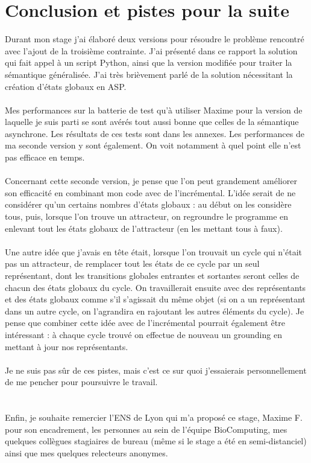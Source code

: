 \documentclass[12pt,a4paper]{article}
\begin{document}
\section{Conclusion et pistes pour la suite}
Durant mon stage j'ai élaboré deux versions pour résoudre le problème rencontré avec l'ajout de la troisième contrainte. J'ai présenté dans ce rapport la solution qui fait appel à un script Python, ainsi que la version modifiée 
pour traiter la sémantique généralisée. J'ai très brièvement parlé de la solution nécessitant la création d'états globaux en ASP.\\ \\
Mes performances sur la batterie de test qu'à utiliser Maxime pour la version de laquelle je suis parti se sont avérés tout aussi bonne que celles de la sémantique asynchrone. Les résultats de ces tests sont dans les annexes. Les 
performances de ma seconde version y sont également. On voit notamment à quel point elle n'est pas efficace en temps.\\ \\
Concernant cette seconde version, je pense que l'on peut grandement améliorer son efficacité en combinant mon code avec de l'incrémental. L'idée serait de ne considérer qu'un certains nombres d'états globaux : au début on les 
considère tous, puis, lorsque l'on trouve un attracteur, on regroundre le programme en enlevant tout les états globaux de l'attracteur (en les mettant tous à faux).\\ \\
Une autre idée que j'avais en tête était, lorsque l'on trouvait un cycle qui n'était pas un attracteur, de remplacer tout les états de ce cycle par un seul représentant, dont les transitions globales entrantes et sortantes 
seront celles de chacun des états globaux du cycle. On travaillerait ensuite avec des représentants et des états globaux comme s'il s'agissait du même objet (si on a un représentant dans un autre cycle, on l'agrandira en rajoutant 
les autres éléments du cycle). Je pense que combiner cette idée avec de l'incrémental pourrait également être intéressant : à chaque cycle trouvé on effectue de nouveau un grounding en mettant à jour nos représentants.\\ \\
Je ne suis pas sûr de ces pistes, mais c'est ce sur quoi j'essaierais personnellement de me pencher pour poursuivre le travail.\\ \\ \\
Enfin, je souhaite remercier l'ENS de Lyon qui m'a proposé ce stage, Maxime F. pour son encadrement, les personnes au sein de l'équipe BioComputing, mes quelques collègues stagiaires de bureau (même si le stage a été en 
semi-distanciel) ainsi que mes quelques relecteurs anonymes.

\newpage

\end{document}
